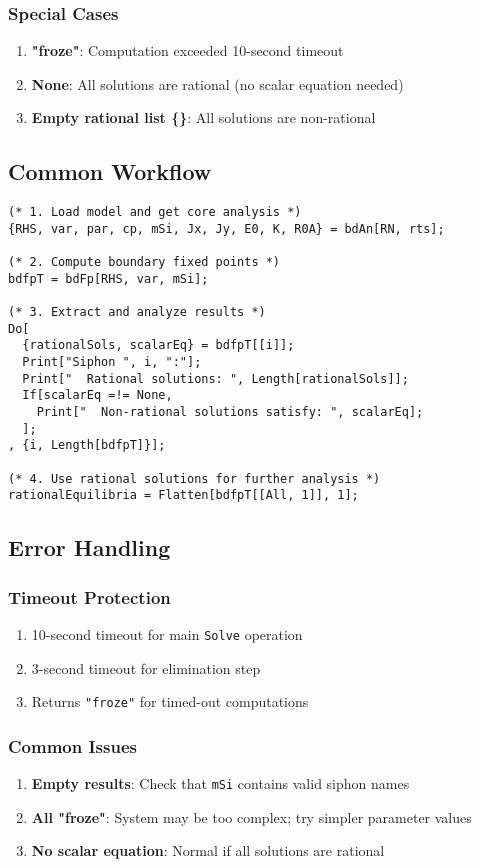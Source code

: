 \documentclass{article}
\begin{document}
\subsubsection{Special Cases}
\begin{enumerate}
\item \textbf{"froze"}: Computation exceeded 10-second timeout
\item \textbf{None}: All solutions are rational (no scalar equation needed)
\item \textbf{Empty rational list \{\}}: All solutions are non-rational
\end{enumerate}

\subsection{Common Workflow}

\begin{lstlisting}
(* 1. Load model and get core analysis *)
{RHS, var, par, cp, mSi, Jx, Jy, E0, K, R0A} = bdAn[RN, rts];

(* 2. Compute boundary fixed points *)
bdfpT = bdFp[RHS, var, mSi];

(* 3. Extract and analyze results *)
Do[
  {rationalSols, scalarEq} = bdfpT[[i]];
  Print["Siphon ", i, ":"];
  Print["  Rational solutions: ", Length[rationalSols]];
  If[scalarEq =!= None,
    Print["  Non-rational solutions satisfy: ", scalarEq];
  ];
, {i, Length[bdfpT]}];

(* 4. Use rational solutions for further analysis *)
rationalEquilibria = Flatten[bdfpT[[All, 1]], 1];
\end{lstlisting}

\subsection{Error Handling}

\subsubsection{Timeout Protection}
\begin{enumerate}
\item 10-second timeout for main \texttt{Solve} operation
\item 3-second timeout for elimination step
\item Returns \texttt{"froze"} for timed-out computations
\end{enumerate}

\subsubsection{Common Issues}
\begin{enumerate}
\item \textbf{Empty results}: Check that \texttt{mSi} contains valid siphon names
\item \textbf{All "froze"}: System may be too complex; try simpler parameter values
\item \textbf{No scalar equation}: Normal if all solutions are rational
\end{enumerate}
\end{document}
